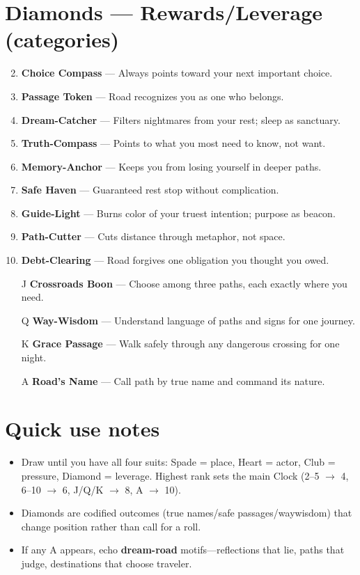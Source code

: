 \section*{Diamonds --- Rewards/Leverage (categories)}
\label{sec:ways-between-rewards}
\begin{enumerate}
\setcounter{enumi}{1}
\item \textbf{Choice Compass} --- Always points toward your next important choice.
\item \textbf{Passage Token} --- Road recognizes you as one who belongs.
\item \textbf{Dream-Catcher} --- Filters nightmares from your rest; sleep as sanctuary.
\item \textbf{Truth-Compass} --- Points to what you most need to know, not want.
\item \textbf{Memory-Anchor} --- Keeps you from losing yourself in deeper paths.
\item \textbf{Safe Haven} --- Guaranteed rest stop without complication.
\item \textbf{Guide-Light} --- Burns color of your truest intention; purpose as beacon.
\item \textbf{Path-Cutter} --- Cuts distance through metaphor, not space.
\item \textbf{Debt-Clearing} --- Road forgives one obligation you thought you owed.
\item[J] \textbf{Crossroads Boon} --- Choose among three paths, each exactly where you need.
\item[Q] \textbf{Way-Wisdom} --- Understand language of paths and signs for one journey.
\item[K] \textbf{Grace Passage} --- Walk safely through any dangerous crossing for one night.
\item[A] \textbf{Road's Name} --- Call path by true name and command its nature.
\end{enumerate}

\section*{Quick use notes}
\label{sec:ways-between-quick-use}
\begin{itemize}
\item Draw until you have all four suits: Spade = place, Heart = actor, Club = pressure, Diamond = leverage. Highest rank sets the main Clock (2--5 $\rightarrow$ 4, 6--10 $\rightarrow$ 6, J/Q/K $\rightarrow$ 8, A $\rightarrow$ 10).
\item Diamonds are codified outcomes (true names/safe passages/waywisdom) that change position rather than call for a roll.
\item If any A appears, echo \textbf{dream-road} motifs---reflections that lie, paths that judge, destinations that choose traveler.
\end{itemize}


